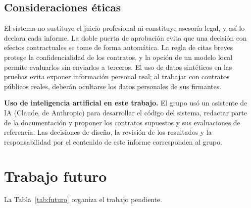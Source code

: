 \documentclass[12pt,letterpaper]{article}
\begin{document}
\subsection{Consideraciones éticas}

El sistema no sustituye el juicio profesional ni constituye asesoría legal, y así lo declara cada informe. La doble puerta de aprobación evita que una decisión con efectos contractuales se tome de forma automática. La regla de citas breves protege la confidencialidad de los contratos, y la opción de un modelo local permite evaluarlos sin enviarlos a terceros. El uso de datos sintéticos en las pruebas evita exponer información personal real; al trabajar con contratos públicos reales, deberán ocultarse los datos personales de sus firmantes.

\par\noindent \textbf{Uso de inteligencia artificial en este trabajo.} El grupo usó un asistente de IA (Claude, de Anthropic) para desarrollar el código del sistema, redactar parte de la documentación y proponer los contratos supuestos y sus evaluaciones de referencia. Las decisiones de diseño, la revisión de los resultados y la responsabilidad por el contenido de este informe corresponden al grupo.
\par

\newpage
\section{Trabajo futuro}

La Tabla~\ref{tab:futuro} organiza el trabajo pendiente.
\end{document}
